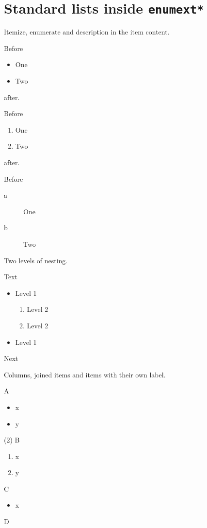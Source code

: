 \documentclass{article}
\begin{document}
\section{Standard lists inside \texttt{enumext*}}

Itemize, enumerate and description in the item content.

\begin{enumext*}[columns=1,label=\arabic*.]
  \item Before \begin{itemize}\item One \item Two\end{itemize} after.
  \item Before \begin{enumerate}\item One \item Two\end{enumerate} after.
  \item Before \begin{description}\item[a] One \item[b] Two\end{description}
\end{enumext*}

Two levels of nesting.

\begin{enumext*}[columns=1,label=\arabic*.]
  \item Text
    \begin{itemize}
      \item Level 1 \begin{enumerate}\item Level 2 \item Level 2\end{enumerate}
      \item Level 1
    \end{itemize}
  \item Next
\end{enumext*}

Columns, joined items and items with their own label.

\begin{enumext*}[columns=3,label=\alph*)]
  \item A \begin{itemize}\item x \item y\end{itemize}
  \item(2) B \begin{enumerate}\item x \item y\end{enumerate}
  \item[X] C \begin{itemize}\item x\end{itemize}
  \item D
\end{enumext*}
\end{document}
